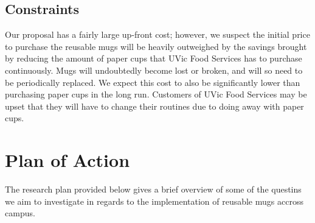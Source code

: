 \documentclass[letterpaper,11pt]{texMemo}
\begin{document}
\subsection*{Constraints}
Our proposal has a fairly large up-front cost; however, we suspect the initial
price to purchase the reusable mugs will be heavily outweighed by the savings
brought by reducing the amount of paper cups that UVic Food Services has to
purchase continuously. Mugs will undoubtedly become lost or broken, and will so
need to be periodically replaced. We expect this cost to also be significantly
lower than purchasing paper cups in the long run. Customers of UVic Food
Services may be upset that they will have to change their routines due to doing
away with paper cups.

\section*{Plan of Action}
The research plan provided below gives a brief overview of some of the questins
we aim to investigate in regards to the implementation of reusable mugs accross
campus.\\\\
\end{document}
